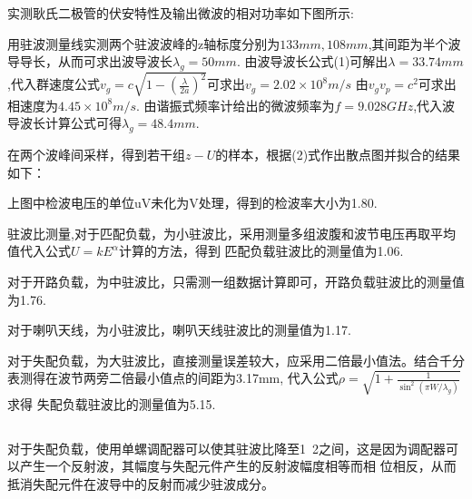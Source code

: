 ﻿\documentclass[10.5pt]{ctexart}
\begin{document}
\section{\textbf{}}
\subsection{\textbf{}}
实测耿氏二极管的伏安特性及输出微波的相对功率如下图所示:\newpage


用驻波测量线实测两个驻波波峰的z轴标度分别为$133mm,108mm$,其间距为半个波导导长，从而可求出波导波长$\lambda_g=50mm$.
由波导波长公式(1)可解出$\lambda=33.74mm$,代入群速度公式$v_g=c \sqrt{1-(\frac{\lambda}{2a})^2}$可求出$v_g=2.02\times 10^8 m/s$
由$v_g v_p=c^2$可求出相速度为$4.45\times 10^8 m/s$.
由谐振式频率计给出的微波频率为$f=9.028GHz$,代入波导波长计算公式可得$\lambda_g=48.4mm$.


在两个波峰间采样，得到若干组$z - U$的样本，根据(2)式作出散点图并拟合的结果如下：


上图中检波电压的单位uV未化为V处理，得到的检波率大小为1.80.\newline


驻波比测量,对于匹配负载，为小驻波比，采用测量多组波腹和波节电压再取平均值代入公式$U=k E^{\alpha}$计算的方法，得到
匹配负载驻波比的测量值为1.06.

对于开路负载，为中驻波比，只需测一组数据计算即可，开路负载驻波比的测量值为1.76.

对于喇叭天线，为小驻波比，喇叭天线驻波比的测量值为1.17.

对于失配负载，为大驻波比，直接测量误差较大，应采用二倍最小值法。结合千分表测得在波节两旁二倍最小值点的间距为3.17mm,
代入公式$\rho=\sqrt{1+\frac{1}{\sin^2(\pi W/\lambda_g)}}$求得 失配负载驻波比的测量值为5.15.



\subsection{\textbf{}}
对于失配负载，使用单螺调配器可以使其驻波比降至1~2之间，这是因为调配器可以产生一个反射波，其幅度与失配元件产生的反射波幅度相等而相
位相反，从而抵消失配元件在波导中的反射而减少驻波成分。
\end{document}
